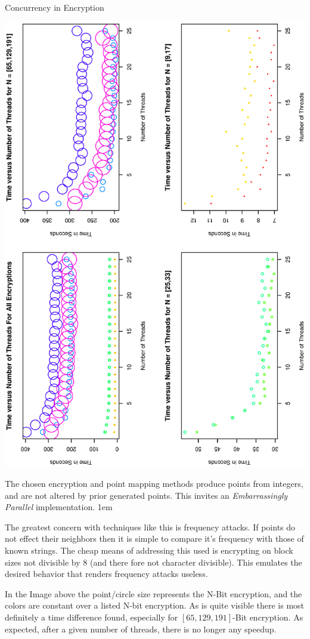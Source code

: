 \documentclass[a0,portrait]{a0poster}
\begin{document}
\vspace{2em}


\begin{slide}{Concurrency in Encryption}

\begin{multicols}{2}
\begin{center}
\includegraphics[height=\columnwidth,angle=-90]{RF/rplot.eps}
\end{center}


The chosen encryption and point mapping methods produce points from integers, and are not altered by prior generated points. This invites an {\em Embarrassingly Parallel} implementation. 
\parskip 1em


The greatest concern with techniques like this is frequency attacks. If points do not effect their neighbors then it is simple to compare it's frequency with those of known strings. The cheap means of addressing this used is encrypting on block sizes not divisible by 8 (and there fore not character divisible). This emulates the desired behavior that renders frequency attacks useless.

In the Image above the point/circle size represents the N-Bit encryption, and the colors are constant over a listed N-bit encryption. As is quite visible there is most definitely a time difference found, especially for $[65,129,191]$-Bit encryption. As expected, after a given number of threads, there is no longer any speedup.




\end{multicols}
\end{slide}
\end{document}

